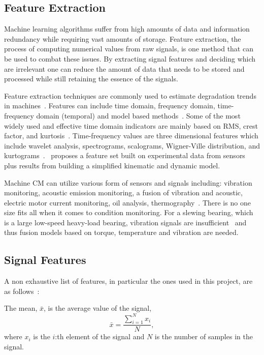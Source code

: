\documentclass[]{article}
\begin{document}
\subsection{Feature Extraction}
Machine learning algorithms suffer from high amounts of data and information redundancy while requiring vast amounts of storage. Feature extraction, the process of computing numerical values from raw signals, is one method that can be used to combat these issues. By extracting signal features and deciding which are irrelevant one can reduce the amount of data that needs to be stored and processed while still retaining the essence of the signals.

Feature extraction techniques are commonly used to estimate degradation trends in machines~\cite{caesarendra2017review,adams2017comparison,hong2014condition}.
Features can include time domain, frequency domain, time-frequency domain (temporal) and model based methods~\cite{teti2010advanced}. Some of the most widely used and effective time domain indicators are mainly based on \gls{RMS}, crest factor, and kurtosis~\cite{soualhi2021novel}. Time-frequency values are three dimensional features which include wavelet analysis, spectrograms, scalograms, Wigner-Ville distribution, and kurtograms~\cite{soualhi2021novel}.~\cite{d2019physical} proposes a feature set built on experimental data from sensors plus results from building a simplified kinematic and dynamic model.

Machine \gls{CM} can utilize various form of sensors and signals including: vibration monitoring, acoustic emission monitoring, a fusion of vibration and acoustic, electric motor current monitoring, oil analysis, thermography~\cite{ahmed2020condition}. There is no one size fits all when it comes to condition monitoring. For a slewing bearing, which is a large low-speed heavy-load bearing, vibration signals are insufficient~\cite{wang2016multiple} and thus fusion models based on torque, temperature and vibration are needed.

\subsection{Signal Features} 	
A non exhaustive list of features, in particular the ones used in this project, are as follows~\cite{diagnosticFeatureDesigner}:

The mean, $ \bar{x} $, is the average value of the signal,
\begin{equation}
\bar{x} = \frac{\sum^N_{i=1} x_i}{N},
\end{equation}
where $ x_i $ is the $ i $:th element of the signal and $ N $ is the number of samples in the signal.
\end{document}

